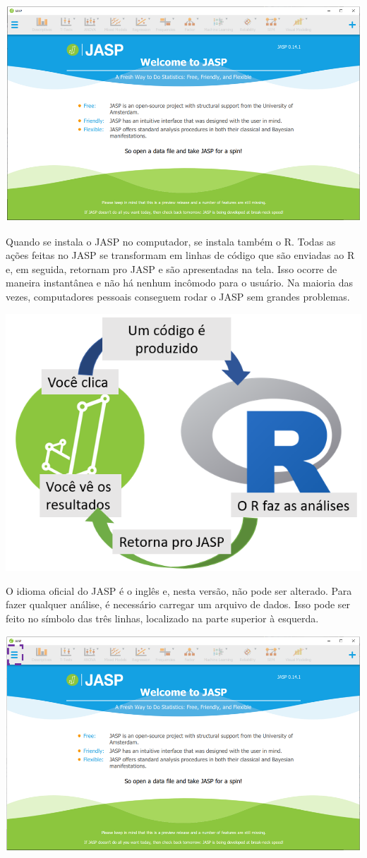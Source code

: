 \documentclass[
]{book}
\begin{document}
\includegraphics{./img/cap_jasp_interface.png}

Quando se instala o JASP no computador, se instala também o R. Todas as ações feitas no JASP se transformam em linhas de código que são enviadas ao R e, em seguida, retornam pro JASP e são apresentadas na tela. Isso ocorre de maneira instantânea e não há nenhum incômodo para o usuário. Na maioria das vezes, computadores pessoais conseguem rodar o JASP sem grandes problemas.

\includegraphics{./img/capa_r_jasp.png}

O idioma oficial do JASP é o inglês e, nesta versão, não pode ser alterado. Para fazer qualquer análise, é necessário carregar um arquivo de dados. Isso pode ser feito no símbolo das três linhas, localizado na parte superior à esquerda.

\includegraphics{./img/cap_jasp_abrir.png}
\end{document}
